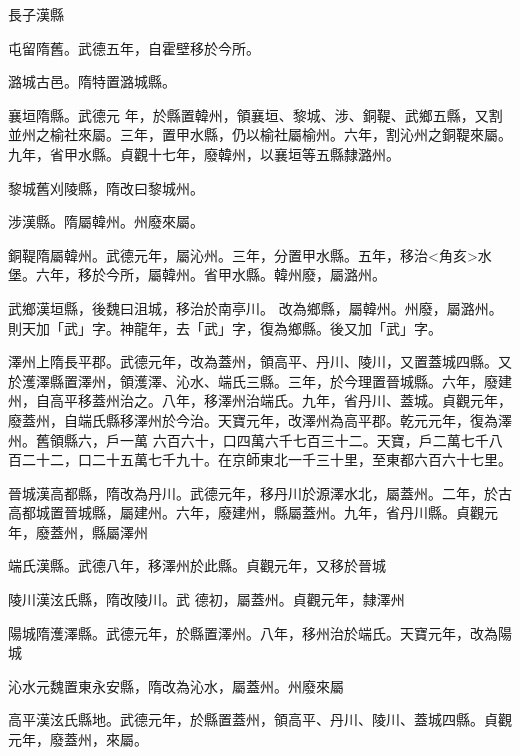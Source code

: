 \begin{pinyinscope}
 長子漢縣



 屯留隋舊。武德五年，自霍壁移於今所。



 潞城古邑。隋特置潞城縣。



 襄垣隋縣。武德元
 年，於縣置韓州，領襄垣、黎城、涉、銅鞮、武鄉五縣，又割並州之榆社來屬。三年，置甲水縣，仍以榆社屬榆州。六年，割沁州之銅鞮來屬。九年，省甲水縣。貞觀十七年，廢韓州，以襄垣等五縣隸潞州。



 黎城舊刈陵縣，隋改曰黎城州。



 涉漢縣。隋屬韓州。州廢來屬。



 銅鞮隋屬韓州。武德元年，屬沁州。三年，分置甲水縣。五年，移治<角亥>水堡。六年，移於今所，屬韓州。省甲水縣。韓州廢，屬潞州。



 武鄉漢垣縣，後魏曰沮城，移治於南亭川。
 改為鄉縣，屬韓州。州廢，屬潞州。則天加「武」字。神龍年，去「武」字，復為鄉縣。後又加「武」字。



 澤州上隋長平郡。武德元年，改為蓋州，領高平、丹川、陵川，又置蓋城四縣。又於濩澤縣置澤州，領濩澤、沁水、端氏三縣。三年，於今理置晉城縣。六年，廢建州，自高平移蓋州治之。八年，移澤州治端氏。九年，省丹川、蓋城。貞觀元年，廢蓋州，自端氏縣移澤州於今治。天寶元年，改澤州為高平郡。乾元元年，復為澤州。舊領縣六，戶一萬
 六百六十，口四萬六千七百三十二。天寶，戶二萬七千八百二十二，口二十五萬七千九十。在京師東北一千三十里，至東都六百六十七里。



 晉城漢高都縣，隋改為丹川。武德元年，移丹川於源澤水北，屬蓋州。二年，於古高都城置晉城縣，屬建州。六年，廢建州，縣屬蓋州。九年，省丹川縣。貞觀元年，廢蓋州，縣屬澤州



 端氏漢縣。武德八年，移澤州於此縣。貞觀元年，又移於晉城



 陵川漢泫氏縣，隋改陵川。武
 德初，屬蓋州。貞觀元年，隸澤州



 陽城隋濩澤縣。武德元年，於縣置澤州。八年，移州治於端氏。天寶元年，改為陽城



 沁水元魏置東永安縣，隋改為沁水，屬蓋州。州廢來屬



 高平漢泫氏縣地。武德元年，於縣置蓋州，領高平、丹川、陵川、蓋城四縣。貞觀元年，廢蓋州，來屬。




\end{pinyinscope}
